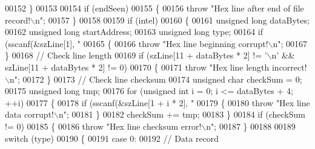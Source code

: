 \begin{DoxyCode}
00152             \}
00153 
00154             \textcolor{keywordflow}{if} (endSeen)
00155             \{
00156                 \textcolor{keywordflow}{throw} \textcolor{stringliteral}{"Hex line after end of file record!\(\backslash\)n"};
00157             \}
00158 
00159             \textcolor{keywordflow}{if} (intel)
00160             \{
00161                 \textcolor{keywordtype}{unsigned} \textcolor{keywordtype}{long}   dataBytes;
00162                 \textcolor{keywordtype}{unsigned} \textcolor{keywordtype}{long}   startAddress;
00163                 \textcolor{keywordtype}{unsigned} \textcolor{keywordtype}{long}   type;
00164                 \textcolor{keywordflow}{if} (sscanf(&szLine[1], \textcolor{stringliteral}{"%
00165                 \{
00166                     \textcolor{keywordflow}{throw} \textcolor{stringliteral}{"Hex line beginning corrupt!\(\backslash\)n"};
00167                 \}
00168                 \textcolor{comment}{// Check line length}
00169                 \textcolor{keywordflow}{if} (szLine[11 + dataBytes * 2] != \textcolor{charliteral}{'\(\backslash\)n'} && szLine[11 + dataBytes * 2] != 0)
00170                 \{
00171                     \textcolor{keywordflow}{throw} \textcolor{stringliteral}{"Hex line length incorrect!\(\backslash\)n"};
00172                 \}
00173                 \textcolor{comment}{// Check line checksum}
00174                 \textcolor{keywordtype}{unsigned} \textcolor{keywordtype}{char}   checkSum = 0;
00175                 \textcolor{keywordtype}{unsigned} \textcolor{keywordtype}{long}   tmp;
00176                 \textcolor{keywordflow}{for} (\textcolor{keywordtype}{unsigned} \textcolor{keywordtype}{int} i = 0; i <= dataBytes + 4; ++i)
00177                 \{
00178                     \textcolor{keywordflow}{if} (sscanf(&szLine[1 + i * 2], \textcolor{stringliteral}{"%
00179                     \{
00180                         \textcolor{keywordflow}{throw} \textcolor{stringliteral}{"Hex line data corrupt!\(\backslash\)n"};
00181                     \}
00182                     checkSum += tmp;
00183                 \}
00184                 \textcolor{keywordflow}{if} (checkSum != 0)
00185                 \{
00186                     \textcolor{keywordflow}{throw} \textcolor{stringliteral}{"Hex line checksum error!\(\backslash\)n"};
00187                 \}
00188 
00189                 \textcolor{keywordflow}{switch} (type)
00190                 \{
00191                 \textcolor{keywordflow}{case} 0:
00192                     \textcolor{comment}{// Data record}
}}
\end{DoxyCode}
